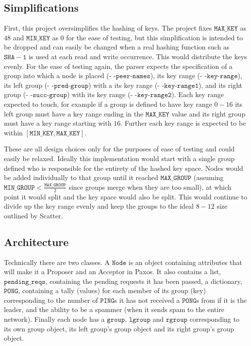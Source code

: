 \documentclass{amsart}
\theoremstyle{definition}
\theoremstyle{remark}
\numberwithin{equation}{section}
\begin{document}
\subsection{Simplifications}
First, this project oversimplifies the hashing of keys. The project fixes $\mathtt{MAX\_KEY}$ as $48$ and $\mathtt{MIN\_KEY}$ as $0$ for the ease of testing, but this simplification is intended to be dropped and can easily be changed when a real hashing function such as $\mathtt{SHA-1}$ is used at each read and write occurrence. This would distribute the keys evenly. For the ease of testing again, the parser expects the specification of a group into which a node is placed (- -$\mathtt{peer}$-$\mathtt{names}$), its key range (- -$\mathtt{key}$-$\mathtt{range}$), its left group (- -$\mathtt{pred}$-$\mathtt{group}$) with a  its key range (- -$\mathtt{key}$-$\mathtt{range1}$), and its right group (- -$\mathtt{succ}$-$\mathtt{group}$) with its key range (- -$\mathtt{key}$-$\mathtt{range2}$). Each key range expected to touch, for example if a group is defined to have key range $0-16$ its left group must have a key range ending in the $\mathtt{MAX\_KEY}$ value and its right group must have a key range starting with $16$. Further each key range is expected to be within $[\mathtt{MIN\_KEY}, \mathtt{MAX\_KEY}]$. 

These are all design choices only for the purposes of ease of testing and could easily be relaxed. Ideally this implementation would start with a single group defined who is responsible for the entirety of the hashed key space. Nodes would be added individually to that group until it reached $\mathtt{MAX\_GROUP}$ (assuming $\mathtt{MIN\_GROUP} < \frac{\mathtt{MAX\_GROUP}}{2}$ since groups merge when they are too small), at which point it would split and the key space would also be split. This would continue to divide up the key range evenly and keep the groups to the ideal $8-12$ size outlined by Scatter.
\subsection{Architecture}
Technically there are two classes. A $\mathtt{Node}$ is an object containing attributes that will make it a Proposer and an Acceptor in Paxos. It also contains a list, $\mathtt{pending\_reqs}$, containing the pending requests it has been passed, a dictionary, $\mathtt{PONG}$, containing a tally (values) for each member of its group (key) corresponding to the number of $\mathtt{PING}$s it has not received a $\mathtt{PONG}$s from if it is the leader, and the ability to be a spammer (when it sends spam to the entire network). Finally each node has a $\mathtt{group}$, $\mathtt{lgroup}$ and $\mathtt{rgroup}$ corresponding to its own group object, its left group's group object and its right group's group object.
\end{document}
